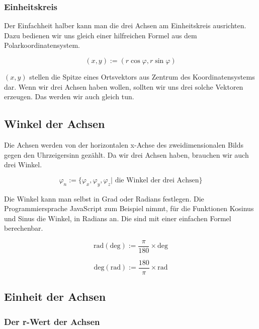 \documentclass[a4paper]{article}
\begin{document}
\subsubsection{Einheitskreis}

Der Einfachheit halber kann man die drei Achsen am Einheitskreis ausrichten. Dazu bedienen wir uns gleich einer hilfreichen Formel aus dem Polarkoordinatensystem.

\begin{displaymath}
	(x,y) := (r \cos \varphi, r \sin \varphi)
\end{displaymath}

$(x,y)$ stellen die Spitze eines Ortsvektors aus Zentrum des Koordinatensystems dar. Wenn wir drei Achsen haben wollen, sollten wir
uns drei solche Vektoren erzeugen. Das werden wir auch gleich tun. 


\subsection{Winkel der Achsen}

Die Achsen werden von der horizontalen x-Achse des zweidimensionalen Bilds gegen den Uhrzeigersinn gez\"ahlt. Da wir drei Achsen haben, brauchen wir auch drei Winkel.

\begin{displaymath}
	\varphi_n := \{ \varphi_x, \varphi_y, \varphi_z | \mbox{ die Winkel der drei Achsen}\}
\end{displaymath}

Die Winkel kann man selbst in Grad oder Radians festlegen. Die Programmiersprache JavaScript zum Beispiel nimmt, f\"ur die Funktionen Kosinus und Sinus die Winkel, in Radians an. Die sind mit einer einfachen Formel berechenbar.

\begin{displaymath}
	\mbox{rad}(\mbox{deg}) := \frac{\pi}{180} \times \mbox{deg}
\end{displaymath}

\begin{displaymath}
	\mbox{deg}(\mbox{rad}) := \frac{180}{\pi} \times \mbox{rad}
\end{displaymath}

\subsection{Einheit der Achsen}
\subsubsection{Der r-Wert der Achsen}
\end{document}
